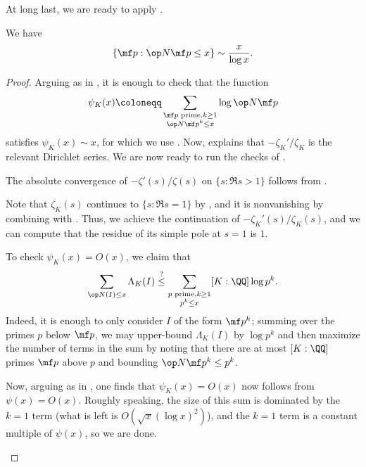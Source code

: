 \documentclass[../thesis.tex]{subfiles}
\begin{document}
At long last, we are ready to apply .
\begin{theorem} \label{thm:prime-ideal}
	We have
	\[\{\mf p:\op N\mf p\le x\}\sim \frac x{\log x}.\]
\end{theorem}
\begin{proof}
	Arguing as in , it is enough to check that the function
	\[\psi_K(x)\coloneqq\sum_{\substack{\mf p\text{ prime},k\ge1\\\op N\mf p^k\le x}}\log\op N\mf p\]
	satisfies $\psi_K(x)\sim x$, for which we use . Now,  explains that $-\zeta_K'/\zeta_K$ is the relevant Dirichlet series. We are now ready to run the checks of .
	\begin{listroman}
		\item The absolute convergence of $-\zeta'(s)/\zeta(s)$ on $\{s:\Re s>1\}$ follows from .

		\item Note that $\zeta_K(s)$ continues to $\{s:\Re s=1\}$ by , and it is nonvanishing by combining  with . Thus, we achieve the continuation of $-\zeta_K'(s)/\zeta_K(s)$, and we can compute that the residue of its simple pole at $s=1$ is $1$.


		\item To check $\psi_K(x)=O(x)$, we claim that
		\[\sum_{\op N(I)\le x}\Lambda_K(I)\stackrel?\le\sum_{\substack{p\text{ prime},k\ge1\\p^k\le x}}[K:\QQ]\log p^k.\]
		Indeed, it is enough to only consider $I$ of the form $\mf p^k$; summing over the primes $p$ below $\mf p$, we may upper-bound $\Lambda_K(I)$ by $\log p^k$ and then maximize the number of terms in the sum by noting that there are at most $[K:\QQ]$ primes $\mf p$ above $p$ and bounding $\op N\mf p^k\le p^k$.

		Now, arguing as in , one finds that $\psi_K(x)=O(x)$ now follows from $\psi(x)=O(x)$. Roughly speaking, the size of this sum is dominated by the $k=1$ term (what is left is $O\left(\sqrt x(\log x)^2\right)$), and the $k=1$ term is a constant multiple of $\psi(x)$, so we are done.
		\qedhere
	\end{listroman}
\end{proof}
\end{document}
